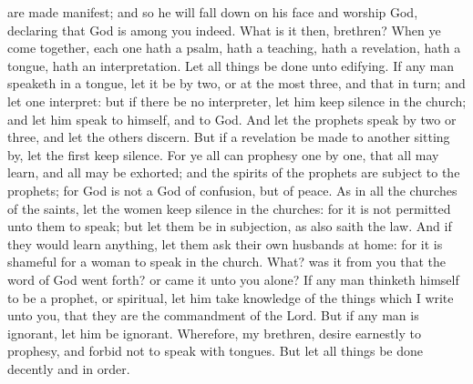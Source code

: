 are made manifest; and so he will fall down on his face and worship God, declaring that God is among you indeed.  What is it then, brethren? When ye come together, each one hath a psalm, hath a teaching, hath a revelation, hath a tongue, hath an interpretation. Let all things be done unto edifying. If any man speaketh in a tongue, let it be by two, or at the most three, and that in turn; and let one interpret: but if there be no interpreter, let him keep silence in the church; and let him speak to himself, and to God. And let the prophets speak by two or three, and let the others discern. But if a revelation be made to another sitting by, let the first keep silence. For ye all can prophesy one by one, that all may learn, and all may be exhorted; and the spirits of the prophets are subject to the prophets; for God is not a God of confusion, but of peace. As in all the churches of the saints, let the women keep silence in the churches: for it is not permitted unto them to speak; but let them be in subjection, as also saith the law. And if they would learn anything, let them ask their own husbands at home: for it is shameful for a woman to speak in the church. What? was it from you that the word of God went forth? or came it unto you alone?  If any man thinketh himself to be a prophet, or spiritual, let him take knowledge of the things which I write unto you, that they are the commandment of the Lord. But if any man is ignorant, let him be ignorant.  Wherefore, my brethren, desire earnestly to prophesy, and forbid not to speak with tongues. But let all things be done decently and in order. 

